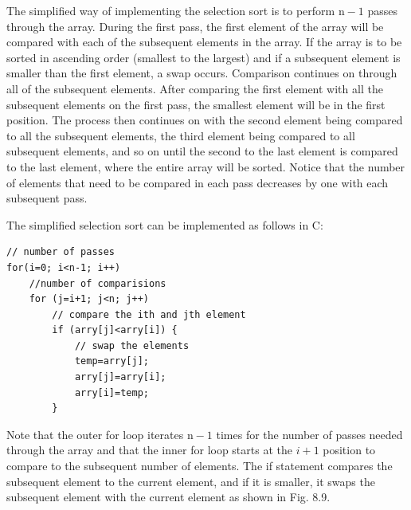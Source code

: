 \documentclass[10pt]{book}
\begin{document}
The simplified way of implementing the selection sort is to perform $\mathrm{n}-1$ passes through the array. During the first pass, the first element of the array will be compared with each of the subsequent elements in the array. If the array is to be\\

sorted in ascending order (smallest to the largest) and if a subsequent element is smaller than the first element, a swap occurs. Comparison continues on through all of the subsequent elements. After comparing the first element with all the subsequent elements on the first pass, the smallest element will be in the first position. The process then continues on with the second element being compared to all the subsequent elements, the third element being compared to all subsequent elements, and so on until the second to the last element is compared to the last element, where the entire array will be sorted. Notice that the number of elements that need to be compared in each pass decreases by one with each subsequent pass.

The simplified selection sort can be implemented as follows in C:

\begin{verbatim}
// number of passes
for(i=0; i<n-1; i++)
    //number of comparisions
    for (j=i+1; j<n; j++)
        // compare the ith and jth element
        if (arry[j]<arry[i]) {
            // swap the elements
            temp=arry[j];
            arry[j]=arry[i];
            arry[i]=temp;
        }
\end{verbatim}

Note that the outer for loop iterates $\mathrm{n}-1$ times for the number of passes needed through the array and that the inner for loop starts at the $i+1$ position to compare to the subsequent number of elements. The if statement compares the subsequent element to the current element, and if it is smaller, it swaps the subsequent element with the current element as shown in Fig. 8.9.
\end{document}
